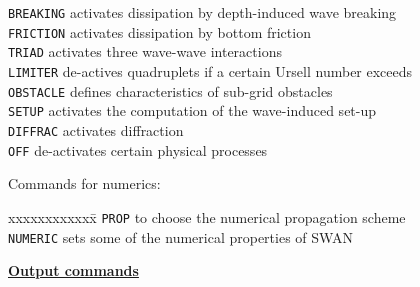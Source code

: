 \documentclass[12pt]{book}
\begin{document}
\begin{description}
\begin{tabbing}
{\tt BREAKING} \> activates dissipation by depth-induced wave breaking\\
{\tt FRICTION} \> activates dissipation by bottom friction\\
{\tt TRIAD}    \> activates three wave-wave interactions\\
{\tt LIMITER}  \> de-actives quadruplets if a certain Ursell number exceeds\\
{\tt OBSTACLE} \> defines characteristics of sub-grid obstacles\\
{\tt SETUP}    \> activates the computation of the wave-induced set-up\\
{\tt DIFFRAC}  \> activates diffraction\\
{\tt OFF}      \> de-activates certain physical processes\\
\end{tabbing}
  \item[(f)] Commands for numerics:
\begin{tabbing}
xxxxxxxxxxxx\= \kill
{\tt PROP}    \> to choose the numerical propagation scheme\\
{\tt NUMERIC} \> sets some of the numerical properties of SWAN\\
\end{tabbing}
\end{description}
\underline{\bf Output commands}
\end{document}
